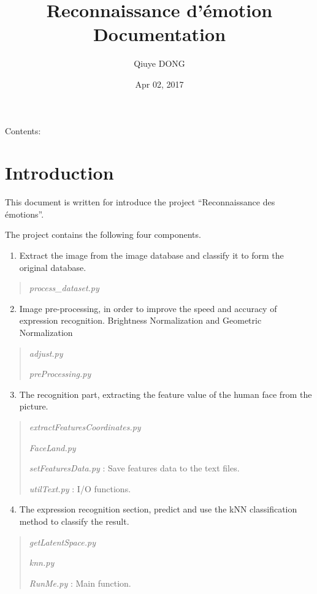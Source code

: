 \documentclass[letterpaper,10pt,english]{sphinxmanual}
\title{Reconnaissance d'émotion Documentation}
\date{Apr 02, 2017}
\author{Qiuye DONG}
\begin{document}
\maketitle
\tableofcontents
{}\label{index::doc}


Contents:


\chapter{Introduction}
\label{Code:introduction}\label{Code:welcome-to-reconnaissance-d-emotion-s-documentation}\label{Code::doc}
This document is written for introduce the project ``Reconnaissance des émotions''.

The project contains the following four components.
\begin{enumerate}
\item {} 
Extract the image from the image database and classify it to form the original database.

\end{enumerate}
\begin{quote}

\emph{process\_dataset.py}
\end{quote}
\begin{enumerate}
\setcounter{enumi}{1}
\item {} 
Image pre-processing, in order to improve the speed and accuracy of expression recognition. Brightness Normalization and Geometric Normalization

\end{enumerate}
\begin{quote}

\emph{adjust.py}

\emph{preProcessing.py}
\end{quote}
\begin{enumerate}
\setcounter{enumi}{2}
\item {} 
The recognition part, extracting the feature value of the human face from the picture.

\end{enumerate}
\begin{quote}

\emph{extractFeaturesCoordinates.py}

\emph{FaceLand.py}

\emph{setFeaturesData.py} : Save features data to the text files.

\emph{utilText.py} : I/O functions.
\end{quote}
\begin{enumerate}
\setcounter{enumi}{3}
\item {} 
The expression recognition section, predict and use the kNN classification method to classify the result.

\end{enumerate}
\begin{quote}

\emph{getLatentSpace.py}

\emph{knn.py}

\emph{RunMe.py} : Main function.
\end{quote}
\end{document}
